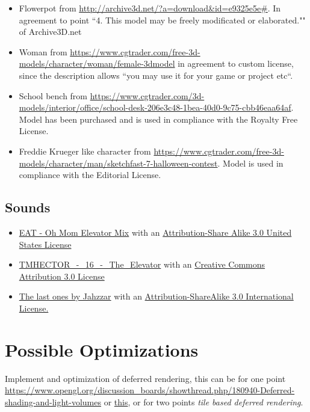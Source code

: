 \documentclass[12pt]{article}
\begin{document}
\begin{itemize}
\item Flowerpot from \url{http://archive3d.net/?a=download\&id=e9325e5e#}. In agreement to point ``4. This model may be freely modificated or elaborated."" of Archive3D.net

\item Woman from \url{https://www.cgtrader.com/free-3d-models/character/woman/female-3dmodel} in agreement to custom license, since the description allows ``you may use it for your game or project etc``.

\item School bench from
\url{ https://www.cgtrader.com/3d-models/interior/office/school-desk-206e3c48-1bea-40d0-9c75-cbb46eaa64af}. Model has been purchased and is used in compliance with the Royalty Free License.

\item Freddie Krueger like character from
\url{https://www.cgtrader.com/free-3d-models/character/man/sketchfast-7-halloween-contest}. Model is used in compliance with the Editorial License.

\end{itemize}

\subsection{Sounds}

\begin{itemize}
\item \href{http://freemusicarchive.org/music/EAT/20100129104001364/Oh_Mom_Elevator_Mix}{EAT - Oh Mom Elevator Mix} with an \href{http://creativecommons.org/licenses/by-sa/3.0/us/}{Attribution-Share Alike 3.0 United States License}
\item \href{http://freemusicarchive.org/music/TMHECTOR/The_Haunted_Mansion/DS10Forumcom\_-\_DS10Forumcom\_-\_The_Haunted_Mansion\_-\_16\_The\_Elevator}{TMHECTOR\_-\_16\_-\_The\_Elevator} with an \href{http://creativecommons.org/licenses/by/3.0/}{Creative Commons Attribution 3.0 License}

\item \href{http://freemusicarchive.org/music/Jahzzar/Smoke_Factory/The_last_ones}{The last ones by Jahzzar} with an \href{http://creativecommons.org/licenses/by-sa/3.0/}{Attribution-ShareAlike 3.0 International License.}

\end{itemize}

\section{Possible Optimizations}
Implement and optimization of deferred rendering, this can be for one point \href{deferred illumination}{https://www.opengl.org/discussion_boards/showthread.php/180940-Deferred-shading-and-light-volumes}
or \href{http://ogldev.atspace.co.uk/www/tutorial37/tutorial37.html}{this}, or for two points \textit{tile based deferred rendering}.



\end{document}
